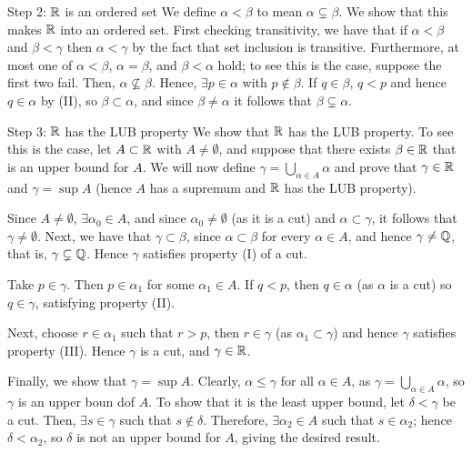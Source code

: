 \begin{nblank}{Step 2: $\mathbb{R}$ is an ordered set}
    We define $\alpha < \beta$ to mean $\alpha \subsetneq \beta$. We show that this makes $\mathbb{R}$ into an ordered set. First checking transitivity, we have that if $\alpha < \beta$ and $\beta < \gamma$ then $\alpha < \gamma$ by the fact that set inclusion is transitive. Furthermore, at most one of $\alpha < \beta$, $\alpha = \beta$, and $\beta < \alpha$ hold; to see this is the case, suppose the first two fail. Then, $\alpha \nsubseteq \beta$. Hence, $\exists p \in \alpha$ with $p \notin \beta$. If $q \in \beta$, $q < p$  and hence $q \in \alpha$ by (II), so $\beta \subset \alpha$, and since $\beta \neq \alpha$ it follows that $\beta \subsetneq \alpha$. 
\end{nblank}

\begin{nblank}{Step 3: $\mathbb{R}$ has the LUB property}
    We show that $\mathbb{R}$ has the LUB property. To see this is the case, let $A \subset \mathbb{R}$ with $A \neq \emptyset$, and suppose that there exists $\beta \in \mathbb{R}$ that is an upper bound for $A$. We will now define $\gamma = \bigcup_{\alpha \in A}\alpha$ and prove that $\gamma \in \mathbb{R}$ and $\gamma = \sup A$ (hence $A$ has a supremum and $\mathbb{R}$ has the LUB property).

    Since $A \neq \emptyset$, $\exists \alpha_0 \in A$, and since $\alpha_0 \neq \emptyset$ (as it is a cut) and $\alpha \subset \gamma$, it follows that $\gamma \neq \emptyset$. Next, we have that $\gamma \subset \beta$, since $\alpha \subset \beta$ for every $\alpha \in A$, and hence $\gamma \neq \mathbb{Q}$, that is, $\gamma \subsetneq \mathbb{Q}$. Hence $\gamma$ satisfies property (I) of a cut. 

    Take $p \in \gamma$. Then $p \in \alpha_1$ for some $\alpha_1 \in A$. If $q < p$, then $q \in \alpha$ (as $\alpha$ is a cut) so $q \in \gamma$, satisfying property (II).

    Next, choose $r \in \alpha_1$ such that $r > p$, then $r \in \gamma$ (as $\alpha_1 \subset \gamma$) and hence $\gamma$ satisfies property (III). Hence $\gamma$ is a cut, and $\gamma \in \mathbb{R}$.

    Finally, we show that $\gamma = \sup A$. Clearly, $\alpha \leq \gamma$ for all $\alpha \in A$, as $\gamma = \bigcup_{\alpha \in A}\alpha$, so $\gamma$ is an upper boun dof $A$. To show that it is the least upper bound, let $\delta < \gamma$ be a cut. Then, $\exists s \in \gamma$ such that $s \notin \delta$. Therefore, $\exists \alpha_2 \in A$ such that $s \in \alpha_2$; hence $\delta < \alpha_2$, so $\delta$ is not an upper bound for $A$, giving the desired result. 
\end{nblank}

